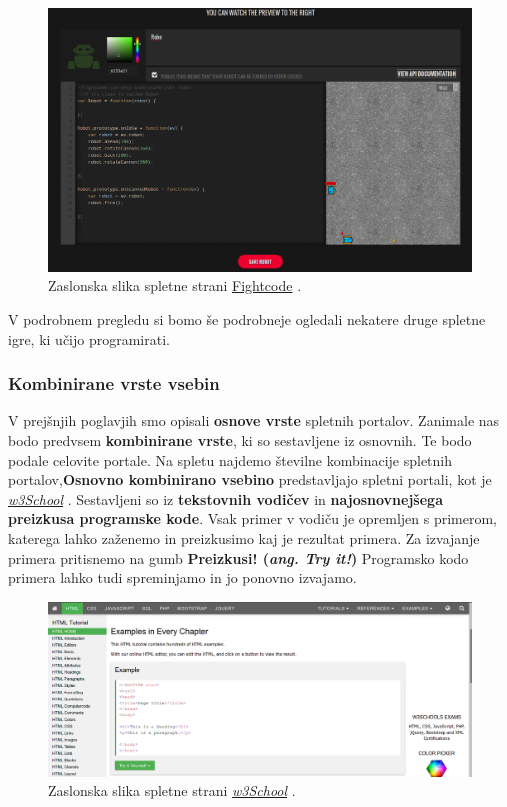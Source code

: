 \begin{figure}[h!]
    \includegraphics [width=1\linewidth, keepaspectratio =
    1] {./images/sc_web/fightRobot_01.png}
    \caption{Zaslonska slika spletne strani
      {\href{http://fightcodegame.com/}{Fightcode}}
      \cite{web:fightcode}.}
    \label{fig:scr:web:w3school}
\end{figure}

V podrobnem pregledu si bomo še podrobneje ogledali nekatere druge
spletne igre, ki učijo programirati.

\subsubsection{Kombinirane vrste vsebin}
\label{sec:kombinirane_vrste_vsebin}

V prejšnjih poglavjih smo opisali \textbf{osnove vrste} spletnih
portalov. Zanimale nas bodo predvsem \textbf{kombinirane vrste}, ki so
sestavljene iz osnovnih. Te bodo podale celovite portale. Na spletu
najdemo številne kombinacije spletnih portalov,\textbf{Osnovno
  kombinirano vsebino} predstavljajo spletni portali, kot je
\emph{\href{http://www.w3schools.com/}{w3School}}
\cite{web:w3school}. Sestavljeni so iz \textbf{tekstovnih vodičev} in
\textbf{najosnovnejšega preizkusa programske kode}. Vsak primer v
vodiču je opremljen s primerom, katerega lahko zaženemo in preizkusimo
kaj je rezultat primera. Za izvajanje primera pritisnemo na gumb
\textbf{Preizkusi!  (\emph{ang. Try it!})} Programsko kodo primera
lahko tudi spreminjamo in jo ponovno izvajamo.

\begin{figure}[h!]
    \includegraphics [width=1\linewidth, keepaspectratio =
    1] {./images/sc_web/w3school.png}
    \caption{Zaslonska slika spletne strani
      \emph{\href{http://www.w3schools.com/}{w3School}}
      \cite{web:w3school}.}
    \label{fig:scr:web:w3school}
\end{figure}

